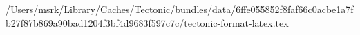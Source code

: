 /Users/msrk/Library/Caches/Tectonic/bundles/data/6ffe055852f8faf66c0acbe1a7fb27f87b869a90bad1204f3bf4d9683f597c7c/tectonic-format-latex.tex